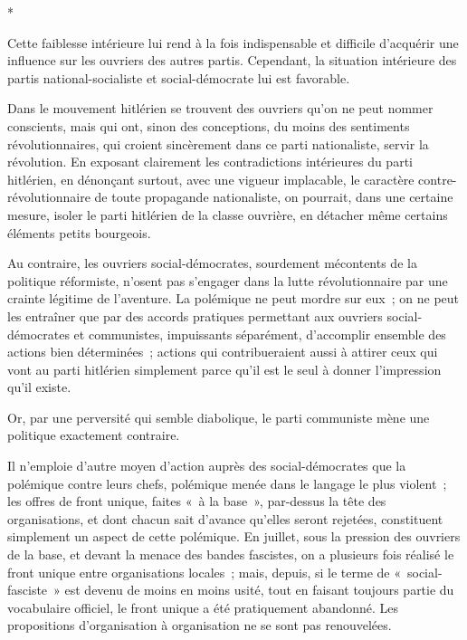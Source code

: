 \documentclass[french,twoside]{book} %
\begin{document}
\begin{center}
\noindent \centerline{*}\par
\end{center}

\noindent Cette faiblesse intérieure lui rend à la fois indispensable et difficile d'ac­quérir une influence sur les ouvriers des autres partis. Cependant, la situation intérieure des partis national-socialiste et social-démocrate lui est favorable.\par
Dans le mouvement hitlérien se trouvent des ouvriers qu'on ne peut nom­mer conscients, mais qui ont, sinon des conceptions, du moins des sentiments révolutionnaires, qui croient sincèrement dans ce parti nationaliste, servir la révolution. En exposant clairement les contradictions intérieures du parti hitlérien, en dénonçant surtout, avec une vigueur implacable, le caractère contre-révolutionnaire de toute propagande nationaliste, on pourrait, dans une certaine mesure, isoler le parti hitlérien de la classe ouvrière, en détacher même certains éléments petits bourgeois.\par
Au contraire, les ouvriers social-démocrates, sourdement mécontents de la politique réformiste, n'osent pas s'engager dans la lutte révolutionnaire par une crainte légitime de l'aventure. La polémique ne peut mordre sur eux ; on ne peut les entraîner que par des accords pratiques permettant aux ouvriers social-démocrates et communistes, impuissants séparément, d'accomplir ensemble des actions bien déterminées ; actions qui contribueraient aussi à attirer ceux qui vont au parti hitlérien simplement parce qu'il est le seul à donner l'impression qu'il existe.\par
Or, par une perversité qui semble diabolique, le parti communiste mène une politique exactement contraire.\par
Il n'emploie d'autre moyen d'action auprès des social-démocrates que la polémique contre leurs chefs, polémique menée dans le langage le plus violent ; les offres de front unique, faites « à la base », par-dessus la tête des organisations, et dont chacun sait d'avance qu'elles seront rejetées, constituent simplement un aspect de cette polémique. En juillet, sous la pression des ouvriers de la base, et devant la menace des bandes fascistes, on a plusieurs fois réalisé le front unique entre organisations locales ; mais, depuis, si le terme de « social-fasciste » est devenu de moins en moins usité, tout en faisant toujours partie du vocabulaire officiel, le front unique a été pratiquement abandonné. Les propositions d'organisation à organisation ne se sont pas renouvelées.\par
\end{document}
